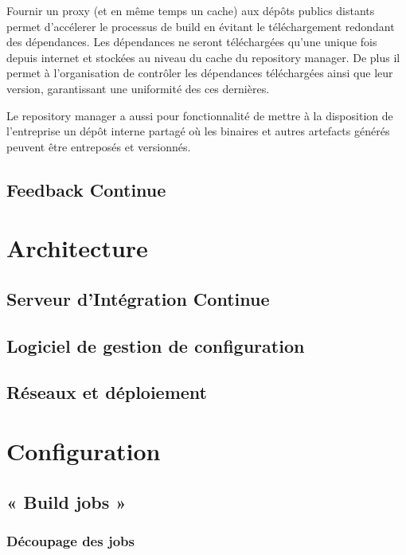       Fournir un proxy (et en même temps un cache) aux dépôts publics distants permet d'accélerer le processus de build en évitant le téléchargement redondant des dépendances. Les dépendances ne seront téléchargées qu'une unique fois depuis internet et stockées au niveau du cache du repository manager. De plus il permet à l'organisation de contrôler les dépendances téléchargées ainsi que leur version, garantissant une uniformité des ces dernières.

      Le repository manager a aussi pour fonctionnalité de mettre à la disposition de l'entreprise un dépôt interne partagé où les binaires et autres artefacts générés peuvent être entreposés et versionnés.\\

    \subsection{Feedback Continue}

  \section{Architecture}

    \subsection{Serveur d’Intégration Continue}

    \subsection{Logiciel de gestion de configuration}

    \subsection{Réseaux et déploiement}

  \section{Configuration}

    \subsection{« Build jobs »}

      \subsubsection{Découpage des jobs}

